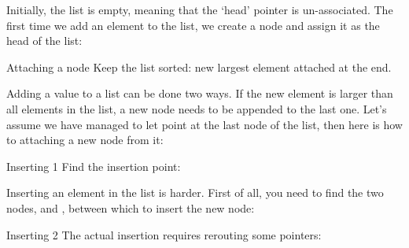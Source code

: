 Initially, the list is empty, meaning that the `head' pointer is
un-associated. The first time we add an element to the list, we create
a node and assign it as the head of the list:
%

\begin{block}{Attaching a node}
  \label{sl:flink4}
  Keep the list sorted: new largest element attached at the end.
  
\end{block}

Adding a value to a list can be done two ways. If the new element is
larger than all elements in the list, a new node needs to be appended
to the last one. Let's assume we have managed
to let  point at the last node of the list,
then here is how to 
attaching a new node from it:
%

\begin{block}{Inserting 1}
  \label{sl:flink5}
  Find the insertion point:
\end{block}

Inserting an element in the list is harder.
First of all, you need to find the two nodes,
 and , between which to insert the new node:
%

\begin{block}{Inserting 2}
  \label{sl:flink6}
  The actual insertion requires rerouting some pointers:
\end{block}



